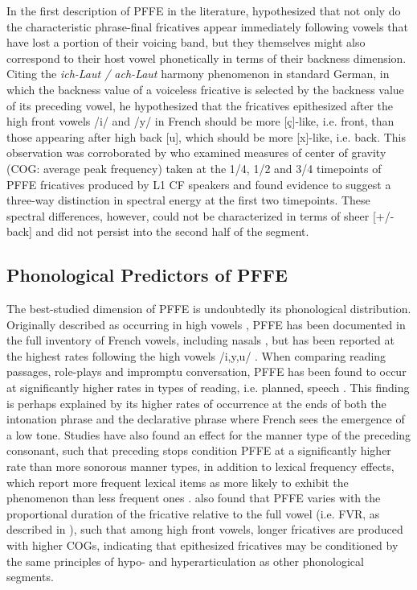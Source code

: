 \documentclass[output=paper,colorlinks,citecolor=brown,draftmode]{langscibook}
\begin{document}
In the first description of PFFE in the literature, \citet{fonagy1989franccais} hypothesized that not only do the characteristic phrase-final fricatives appear immediately following vowels that have lost a portion of their voicing band, but they themselves might also correspond to their host vowel phonetically in terms of their backness dimension. Citing the \emph{ich-Laut / ach-Laut} harmony phenomenon in standard German, in which the backness value of a voiceless fricative is selected by the backness value of its preceding vowel, he hypothesized that the fricatives epithesized after the high front vowels /i/ and /y/ in French should be more [ç]-like, i.e. front, than those appearing after high back [u], which should be more [x]-like, i.e. back. This observation was corroborated by \citet{dalola2015profile} who examined measures of center of gravity (COG: average peak frequency) taken at the 1/4, 1/2 and 3/4 timepoints of PFFE fricatives produced by L1 CF speakers and found evidence to suggest a three-way distinction in spectral energy at the first two timepoints. These spectral differences, however, could not be characterized in terms of sheer [+/- back] and did not persist into the second half of the segment.

\subsection{Phonological Predictors of PFFE}
The best-studied dimension of PFFE is undoubtedly its phonological distribution. Originally described as occurring in high vowels \citep{fonagy1989franccais}, PFFE has been documented in the full inventory of French vowels, including nasals \citep{smith2006and}, but has been reported at the highest rates following the high vowels /i,y,u/ \citep{fagyal1999sound,martin2004devoisement, smith2003vowel, smith2006and}. When comparing reading passages, role-plays and impromptu conversation, PFFE has been found to occur at significantly higher rates in types of reading, i.e. planned, speech \citep{fagyal1999sound,dalola2014drole}. This finding is perhaps explained by its higher rates of occurrence at the ends of both the intonation phrase and the declarative phrase \citep{fagyal1999sound, smith2003vowel} where French sees the emergence of a low tone. Studies have also found an effect for the manner type of the preceding consonant, such that preceding stops condition PFFE at a significantly higher rate than more sonorous manner types, in addition to lexical frequency effects, which report more frequent lexical items as more likely to exhibit the phenomenon than less frequent ones \citep{dalola2015role}. \citet{dalola2019shape, dalola2020redefining} also found that PFFE varies with the proportional duration of the fricative relative to the full vowel (i.e. FVR, as described in ), such that among high front vowels, longer fricatives are produced with higher COGs, indicating that epithesized fricatives may be conditioned by the same principles of hypo- and hyperarticulation \citep{lindblom1990explaining} as other phonological segments.
\end{document}
